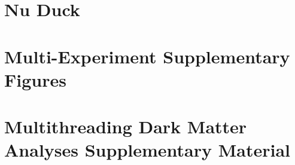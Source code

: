 \documentclass[PhD]{msu-thesis}
\begin{document}
\chapter{Nu Duck\label{sec:nu_duck}}

\begin{appendices}

\chapter{Multi-Experiment Supplementary Figures}\label{apdx:gd_spatial_maps}


\chapter{Multithreading Dark Matter Analyses Supplementary Material}\label{apdx:mtd_supp_figures}


\end{appendices}

\backmatter
\SingleSpacing
\printbibliography
\end{document}
